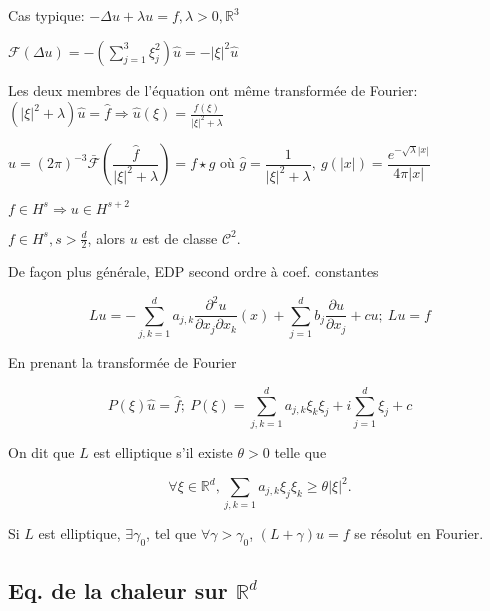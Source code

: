 \documentclass[10pt,a4paper,oneside]{article}
\newenvironment{exercice}[1][Exercice]{\begin{trivlist}
\item[\hskip \labelsep {\bfseries #1}]}{\end{trivlist}}
\begin{document}
\begin{itemize}
\item
Cas typique: $-\Delta u + \lambda u = f, \lambda > 0, \mathbb{R}^3$

$\mathcal{F}(\Delta u) = -(\sum_{j = 1}^3 \xi_j^2) \hat{u} = -|\xi|^2 \hat{u}$

Les deux membres de l'équation ont même transformée de Fourier: $(|\xi|^2 + \lambda) \hat{u} = \hat{f} \Rightarrow \boxed{\hat{u}(\xi) = \frac{\hat{f}(\xi)}{|\xi|^2 + \lambda}}$

$u = (2\pi)^{-3} \bar{\mathcal{F}} \left( \dfrac{\hat{f}}{|\xi|^2 + \lambda} \right) = f \star g$ où $\hat{g} = \dfrac{1}{|\xi|^2 + \lambda},\ g(|x|) = \dfrac{e^{-\sqrt{\lambda} |x|}}{4 \pi |x|}$

\item
$f \in H^s \Rightarrow u \in H^{s + 2}$

\item
\begin{exercice}
$f \in H^s, s > \frac{d}{2}$, alors $u$ est de classe $\mathcal{C}^2$.
\end{exercice}

\item
De façon plus générale, EDP second ordre à coef. constantes

\[ Lu = -\sum_{j,k = 1}^d a_{j,k} \frac{\partial^2 u}{\partial x_j \partial x_k}(x) + \sum_{j = 1}^d b_j \frac{\partial u}{\partial x_j} + cu;\ Lu = f \]

En prenant la transformée de Fourier

\[ P(\xi) \hat{u} = \hat{f};\ P(\xi) = \sum_{j,k = 1}^d a_{j,k} \xi_k \xi_j + i \sum_{j = 1}^d \xi_j + c \]

On dit que $L$ est elliptique s'il existe $\theta > 0$ telle que

\[ \forall \xi \in \mathbb{R}^d, \sum_{j,k = 1} a_{j,k} \xi_j \xi_k \geq \theta |\xi|^2. \]

\item
\begin{exercice}
Si $L$ est elliptique, $\exists \gamma_0$, tel que $\forall \gamma > \gamma_0$, $(L + \gamma) u = f$ se résolut en Fourier.
\end{exercice}
\end{itemize}

\subsection{Eq. de la chaleur sur $\mathbb{R}^d$}
\end{document}
